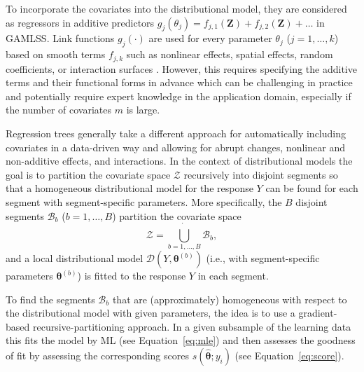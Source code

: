 \documentclass[aoas, preprint]{imsart}
\numberwithin{equation}{subsection}
\begin{document}
To incorporate the covariates into the distributional model, 
they are considered as regressors in additive predictors
$g_j(\theta_j) = f_{j,1}(\bm{Z}) + f_{j,2}(\bm{Z}) + \dots$
in GAMLSS.
Link functions $g_j(\cdot)$ are used for every parameter $\theta_j$
($j = 1, \dots, k$) based on smooth terms $f_{j,k}$ such as
nonlinear effects, spatial effects, random coefficients, or interaction surfaces
\citep{Klein+Kneib+Lang:2015}. However, this requires specifying the
additive terms and their functional forms in advance which can be challenging in
practice and potentially require expert knowledge in the application domain, 
especially if the number of covariates $m$ is large.

Regression trees generally take a different approach for automatically
including covariates in a data-driven way and allowing for abrupt
changes, nonlinear and non-additive effects, and interactions. In the context of
distributional models the goal is to partition the covariate space
$\mathcal{Z}$ recursively into disjoint segments so that a homogeneous
distributional model for the response $Y$ can be found for each segment with segment-specific
parameters. More specifically, the $B$ disjoint segments $\mathcal{B}_b$
($b = 1, \dots, B$) partition the covariate space
\begin{equation}
\label{eq:partition}
\mathcal{Z} = \dot{\bigcup\limits_{b = 1, \ldots, \textit{B}}} \mathcal{B}_b,
\end{equation}
and a local distributional model $\mathcal{D}(Y, \bm{\theta}^{(b)})$
(i.e., with segment-specific parameters $\bm{\theta}^{(b)}$) is fitted to the
response $Y$ in each segment.

To find the segments $\mathcal{B}_b$ that are (approximately) homogeneous
with respect to the distributional model with given parameters, the idea
is to use a gradient-based recursive-partitioning approach. In a given
subsample of the learning data this fits the model by ML (see
Equation~\ref{eq:mle}) and then assesses the goodness of fit by assessing the
corresponding scores $s(\bm{\hat \theta}; y_i)$ (see Equation~\ref{eq:score}).
\end{document}
